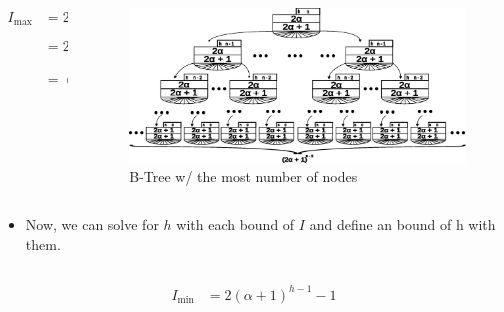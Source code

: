 \begin{frame}
    \begin{columns}
        \begin{column}{0.5\textwidth}
            \begin{block}{}
                \vspace{-0.75cm}
                \[
                    \begin{aligned}
                        I_{\text{max}} &= 2\alpha\left(N_{\text{max}}\left(T\right)\right) \\
                        &= 2\alpha \left(\frac{\left(2\alpha + 1\right)^h - 1}{2\alpha}\right) \\
                        &= \left(2\alpha + 1\right)^h - 1
                    \end{aligned}
                \]
            \end{block}
        \end{column}
        \begin{column}{0.5\textwidth}
            \begin{figure}
                \includegraphics[width=0.95\linewidth,keepaspectratio]{resources/made/generic_max_btree.eps}
                \caption[]{B-Tree w/ the most number of nodes}
            \end{figure}
        \end{column}
    \end{columns}
    \begin{itemize}
        \item Now, we can solve for \(h\) with each bound of \(I\) and define an bound of h with them.
    \end{itemize}
    \begin{columns}
        \begin{column}{0.5\textwidth}
            \begin{block}{}
                \[
                    \begin{aligned}
                        I_{\text{min}} &= 2\left(\alpha + 1\right)^{h - 1} - 1 \\

\end{aligned}\]
\end{block}
\end{column}
\end{columns}
\end{frame}
